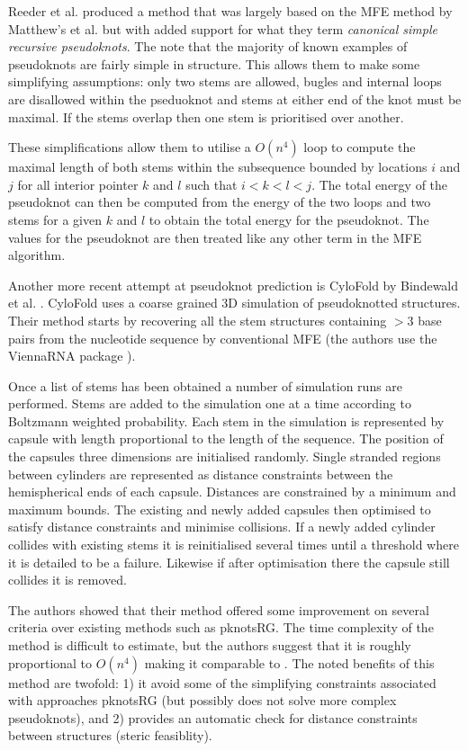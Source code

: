 \documentclass[journal]{IEEEtran}
\begin{document}
Reeder et al. \cite{reeder2007pknotsrg} produced a method that was largely based on the MFE method by Matthew's et al. \cite{mathews1999expanded} but with added support for what they term \textit{canonical simple recursive pseudoknots}. The note that the majority of known examples of pseudoknots are fairly simple in structure. This allows them to make some simplifying assumptions: only two stems are allowed, bugles and internal loops are disallowed within the pseduoknot and stems at either end of the knot must be maximal. If the stems overlap then one stem is prioritised over another. 

These simplifications allow them to utilise a $O(n^4)$ loop to compute the maximal length of both stems within the subsequence bounded by locations $i$ and $j$ for all interior pointer $k$ and $l$ such that $i < k < l < j$. The total energy of the pseudoknot can then be computed from the energy of the two loops and two stems for a given $k$ and $l$ to obtain the total energy for the pseudoknot. The values for the pseudoknot are then treated like any other term in the MFE algorithm.

Another more recent attempt at pseudoknot prediction is CyloFold by Bindewald et al. \cite{bindewald2010cylofold}. CyloFold uses a coarse grained 3D simulation of pseudoknotted structures. Their method starts by recovering all the stem structures containing $>3$ base pairs from the nucleotide sequence by conventional MFE (the authors use the ViennaRNA package \cite{lorenz2011viennarna}). 

Once a list of stems has been obtained a number of simulation runs are performed. Stems are added to the simulation one at a time according to Boltzmann weighted probability. Each stem in the simulation is represented by capsule with length proportional to the length of the sequence. The position of the capsules three dimensions are initialised randomly. Single stranded regions between cylinders are represented as distance constraints between the hemispherical ends of each capsule. Distances are constrained by a minimum and maximum bounds. The existing and newly added capsules then optimised to satisfy distance constraints and minimise collisions. If a newly added cylinder collides with existing stems it is reinitialised several times until a threshold where it is detailed to be a failure. Likewise if after optimisation there the capsule still collides it is removed.

The authors showed that their method offered some improvement on several criteria over existing methods such as pknotsRG. The time complexity of the method is difficult to estimate, but the authors suggest that it is roughly proportional to $O(n^4)$ making it comparable to \cite{reeder2007pknotsrg}. The noted benefits of this method are twofold: 1) it avoid some of the simplifying constraints associated with approaches pknotsRG (but possibly does not solve more complex pseudoknots), and 2) provides an automatic check for distance constraints between structures (steric feasiblity).
\end{document}
